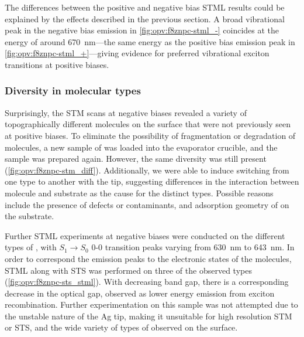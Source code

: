 The differences between the positive and negative bias \ac{STML} results could be explained by the effects described in the previous section.  A broad vibrational peak in the negative bias emission in \autoref{fig:opv:f8znpc-stml_-} coincides at the energy of around \SI{670}{nm}---the same energy as the positive bias emission peak in \autoref{fig:opv:f8znpc-stml_+}---giving evidence for preferred vibrational exciton transitions at positive biases.



\subsubsection*{Diversity in molecular types}


Surprisingly, the \ac{STM} scans at negative biases revealed a variety of topographically different molecules on the surface that were not previously seen at positive biases. To eliminate the possibility of fragmentation or degradation of molecules, a new sample of  was loaded into the evaporator crucible, and the sample was prepared again. However, the same diversity was still present (\autoref{fig:opv:f8znpc-stm_diff}). Additionally, we were able to induce switching from one type to another with the tip, suggesting differences in the interaction between molecule and substrate as the cause for the distinct types. Possible reasons include the presence of defects or contaminants, and adsorption geometry of  on the substrate.


\begin{figure} [h]
    \centering
    \caption{}
    \label{fig:opv:f8znpc-stm_diff}
\end{figure}

Further \ac{STML} experiments at negative biases were conducted on the different types of , with $S_1 \rightarrow S_0$ 0-0 transition peaks varying from \SI{630}{nm} to \SI{643}{nm}. In order to correspond the emission peaks to the electronic states of the molecules, \ac{STML} along with \ac{STS} was performed on three of the observed types (\autoref{fig:opv:f8znpc-sts_stml}). With decreasing band gap, there is a corresponding decrease in the optical gap, observed as lower energy emission from exciton recombination. Further experimentation on this sample was not attempted due to the unstable nature of the Ag tip, making it unsuitable for high resolution \ac{STM} or \ac{STS}, and the wide variety of types of  observed on the surface. 


